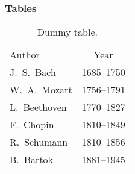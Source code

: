 \begin{frame}
	\frametitle{Tables}%
    \begin{table}[t]
        \caption{Dummy table.}
        \label{tab:example}  
        \begin{tabular}{lc}
            \rowcolor{colorfamA!30!white}
            Author & Year\\
            J.\ S.\ Bach
            & 1685--1750 \\
            W.\ A.\ Mozart & 1756--1791 \\
            L.\ Beethoven & 1770--1827 \\
            F.\ Chopin
            & 1810--1849 \\
            R.\ Schumann
            & 1810--1856 \\
            B.\ Bartok & 1881--1945 \\
        \end{tabular}
    \end{table}
\end{frame}